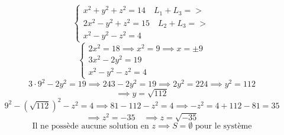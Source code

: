 \documentclass{article}
\begin{document}
\[
\begin{cases}
x^2 + y^2 + z^2 = 14 \quad L_1+L_3 =>\\
2x^2 - y^2 + z^2 = 15 \quad L_2+L_3 =>\\
x^2 - y^2 - z^2 = 4
\end{cases}
\]
\[
\begin{cases}
2x^2 = 18 \implies x^2 = 9 \implies x = \pm 9 \\
3x^2 - 2y^2 = 19 \\
x^2 - y^2 - z^2 = 4
\end{cases}
\]
\[ 3 \cdot 9^2 - 2y^2 = 19 \implies 243 - 2y^2 = 19 \implies 2y^2 = 224 \implies y^2 = 112 \]
\[ \implies y = \sqrt{112} \]
\[ 9^2 - (\sqrt{112})^2 - z^2 = 4 \implies 81 - 112 - z^2 = 4 \implies -z^2 = 4 + 112 - 81 = 35 \]
\[ \implies z^2 = -35 \quad \implies z = \sqrt{-35} \]
\[ \text{Il ne possède aucune solution en } z \implies S = \emptyset \text{ pour le système} \]
\end{document}
